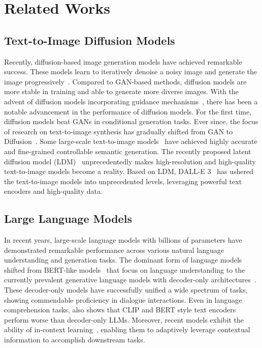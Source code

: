 \section{Related Works}
\label{sec:related}

\subsection{Text-to-Image Diffusion Models}
Recently, diffusion-based image generation models have achieved remarkable success. These models learn to iteratively denoise a noisy image and generate the image progressively~\cite{DDPM}.
Compared to GAN-based methods, diffusion models are more stable in training and able to generate more diverse images.
% 
With the advent of diffusion models incorporating guidance mechanisms~\cite{guid_cls, guid_cls_free}, there has been a notable advancement in the performance of diffusion models. For the first time, diffusion models beat GANs in conditional generation tasks. 
Ever since, the focus of research on text-to-image synthesis has gradually shifted from GAN to Diffusion~\cite{GLIDE, RiFeGAN, ZeroShotGen, ctrlGAN}. Some large-scale text-to-image models~\cite{Dalle3, CogView, Parti, LDM} have achieved highly accurate and fine-grained controllable semantic generation. The recently proposed latent diffusion model (LDM)~\cite{LDM} unprecedentedly makes high-resolution and high-quality text-to-image models become a reality. Based on LDM, DALL-E 3~\cite{Dalle3} has ushered the text-to-image models into unprecedented levels, leveraging powerful text encoders and high-quality data.

\subsection{Large Language Models}
In recent years, large-scale language models with billions of parameters have demonstrated remarkable performance across various natural language understanding and generation tasks. 
The dominant form of language models shifted from BERT-like models~\cite{BERT, RoBERTa} that focus on language understanding to the currently prevalent generative language models with decoder-only architectures~\cite{Llama2, GPT4, phi1.5, PaLM}. These decoder-only models have successfully unified a wide spectrum of tasks, showing commendable proficiency in dialogue interactions. 
Even in language comprehension tasks, \cite{CLIP-BERT, MMLU_paper} also shows that CLIP and BERT style text encoders perform worse than decoder-only LLMs.
Moreover, recent models exhibit the ability of in-context learning~\cite{LLMfewshot}, enabling them to adaptively leverage contextual information to accomplish downstream tasks. 

